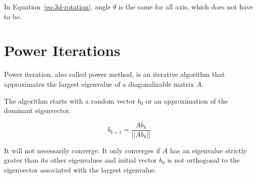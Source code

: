 In Equation~\ref{eq:3d-rotation}, angle $\theta$ is the same for all axis, which does not have to be.


\section{Power Iterations}
\label{sec:powerIterations}

Power iteration, also called power method, is an iterative algorithm
that approximates the largest eigenvalue of a diagonalizable matrix $A$.

The algorithm starts with a random vector $b_0$ or an approximation of the dominant eigenvector.

\begin{equation}
    \label{eq:powerIterations}
    b_{k+1} = \frac{Ab_k}{||Ab_k||}
\end{equation}

It will not necessarily converge. It only converges if $A$ has an eigenvalue strictly grater than its other eigenvalues
and initial vector $b_0$ is not orthogonal to the eigenvector associated with the largest eigenvalue.
